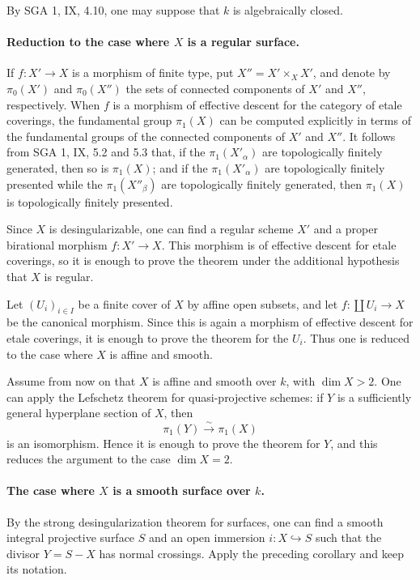 \documentclass[11pt]{article}
\theoremstyle{plain}
\theoremstyle{definition}
\theoremstyle{remark}
\begin{document}
By SGA 1, IX, 4.10, one may suppose that $k$ is algebraically closed.

\paragraph{Reduction to the case where $X$ is a regular surface.}
If $f:X'\to X$ is a morphism of finite type, put $X''=X'\times_X X'$, and denote by $\pi_0(X')$ and $\pi_0(X'')$ the sets of connected components of $X'$ and $X''$, respectively. When $f$ is a morphism of effective descent for the category of etale coverings, the fundamental group $\pi_1(X)$ can be computed explicitly in terms of the fundamental groups of the connected components of $X'$ and $X''$. It follows from SGA 1, IX, 5.2 and 5.3 that, if the $\pi_1(X'_\alpha)$ are topologically finitely generated, then so is $\pi_1(X)$; and if the $\pi_1(X'_\alpha)$ are topologically finitely presented while the $\pi_1(X''_\beta)$ are topologically finitely generated, then $\pi_1(X)$ is topologically finitely presented.

Since $X$ is desingularizable, one can find a regular scheme $X'$ and a proper birational morphism $f:X'\to X$. This morphism is of effective descent for etale coverings, so it is enough to prove the theorem under the additional hypothesis that $X$ is regular.

Let $(U_i)_{i\in I}$ be a finite cover of $X$ by affine open subsets, and let $f:\coprod U_i\to X$ be the canonical morphism. Since this is again a morphism of effective descent for etale coverings, it is enough to prove the theorem for the $U_i$. Thus one is reduced to the case where $X$ is affine and smooth.

Assume from now on that $X$ is affine and smooth over $k$, with $\dim X>2$. One can apply the Lefschetz theorem for quasi-projective schemes: if $Y$ is a sufficiently general hyperplane section of $X$, then
\[
 \pi_1(Y)\xrightarrow{\sim}\pi_1(X)
\]
is an isomorphism. Hence it is enough to prove the theorem for $Y$, and this reduces the argument to the case $\dim X=2$.

\paragraph{The case where $X$ is a smooth surface over $k$.}
By the strong desingularization theorem for surfaces, one can find a smooth integral projective surface $S$ and an open immersion $i:X\hookrightarrow S$ such that the divisor $Y=S-X$ has normal crossings. Apply the preceding corollary and keep its notation.
\end{document}
